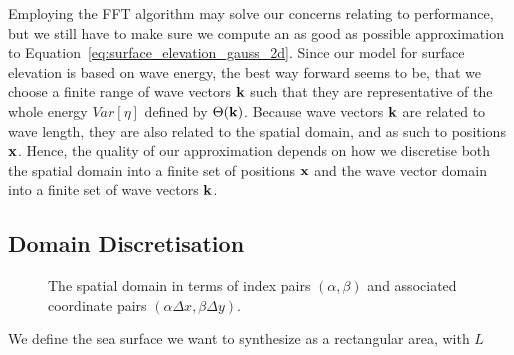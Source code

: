 Employing the FFT algorithm may solve our concerns relating to performance, but 
we still have to make sure we compute an as good as possible approximation to 
Equation~\ref{eq:surface_elevation_gauss_2d}. Since our model for surface 
elevation is based on wave energy, the best way forward seems to be, that we 
choose a finite range of wave vectors $\mathbf{k}$ such that they are 
representative of the whole energy $Var[\eta]$ defined by $\Theta(\mathbf{k})$. 
Because wave vectors $\mathbf{k}$ are related to wave length, they are also 
related to the spatial domain, and as such to positions $\mathbf{x}$. Hence, the 
quality of our approximation depends on how we discretise both the spatial 
domain into a finite set of positions $\mathbf{x}$ and the wave vector domain 
into a finite set of wave vectors $\mathbf{k}$.
%
\subsection{Domain Discretisation}
\label{sec:domain_discretisation}
%
\begin{figure}
\centering
{}
\caption{The spatial domain in terms of index pairs $(\alpha,\beta)$ and
associated coordinate pairs $(\alpha\Delta x,\beta\Delta y)$.}
\label{fig:spatial_domain}
\end{figure}
%
We define the sea surface we want to synthesize as a rectangular area, with $L$
